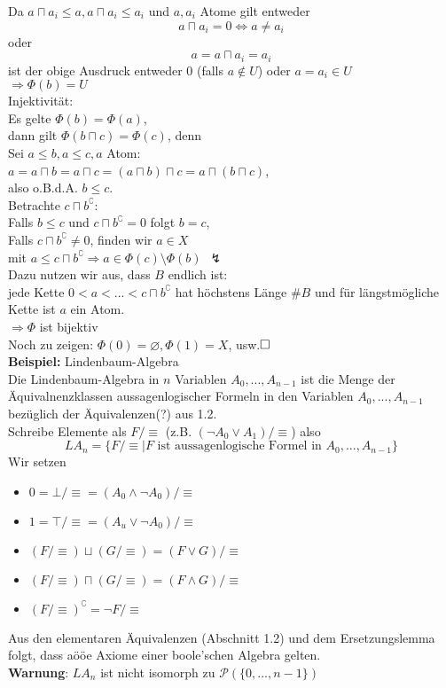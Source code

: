 \documentclass[a4paper]{scrartcl}
\begin{document}
Da $a \sqcap a_i \leq a, a \sqcap a_i \leq a_i $ und $a,a_i$ Atome gilt entweder
$$a \sqcap a_i = 0 \Leftrightarrow a \neq a_i$$
oder
$$a = a \sqcap a_i = a_i$$
ist der obige Ausdruck entweder $0$ (falls $a \notin U$) oder $a = a_i \in U$\\
$\Rightarrow \Phi(b) = U$\medskip\\
Injektivität:\\
Es gelte $\Phi(b) = \Phi(a)$,\\ 
dann gilt $\Phi(b \sqcap c) = \Phi(c)$, denn\medskip\\
Sei $a \leq b, a \leq c, a$ Atom:\\
$a = a \sqcap b = a \sqcap c = (a \sqcap b) \sqcap c = a \sqcap (b \sqcap c)$,\\
also o.B.d.A. $b \leq c$.\smallskip\\
Betrachte $c \sqcap b^\complement$:\\
Falls $b \leq c$ und $c \sqcap b^\complement = 0$ folgt $b=c$,\\
Falls $c \sqcap b^\complement \neq 0$, finden wir $a \in X$\\
mit $a \leq c \sqcap b^\complement \Rightarrow a \in \Phi(c)\setminus \Phi(b)\ \ \lightning$\medskip\\ %
Dazu nutzen wir aus, dass $B$ endlich ist:\\
jede Kette $0 < a < ... < c \sqcap b^\complement$ hat höchstens Länge $\#B$ und für längstmögliche Kette ist $a$ ein Atom.\medskip\\
$\Rightarrow \Phi$ ist bijektiv\medskip\\
Noch zu zeigen: $\Phi(0)= \varnothing, \Phi(1) = X$, usw.$\hfill\square$\medskip\\
\textbf{Beispiel:} Lindenbaum-Algebra\\
Die Lindenbaum-Algebra in $n$ Variablen $A_0,...,A_{n-1}$ ist die Menge der Äquivalnenzklassen aussagenlogischer Formeln in den Variablen $A_0,...,A_{n-1}$ bezüglich der Äquivalenzen(?) aus 1.2.\smallskip\\
Schreibe Elemente als $F/\equiv$ (z.B. $(\lnot A_0 \lor A_1)/\equiv$) also
$$L A_n = \{F/\equiv \mid F\text{ ist aussagenlogische Formel in }A_0,...,A_{n-1}\}$$
Wir setzen
\begin{itemize}
\item $0 = \bot/\equiv = (A_0 \land \lnot A_0)/\equiv$
\item $1 = \top /\equiv = (A_u \lor \lnot A_0)/\equiv$
\item $(F/\equiv)\sqcup(G/\equiv) = (F \lor G)/\equiv$
\item $(F/\equiv) \sqcap (G/\equiv) = (F \land G)/\equiv$
\item $(F/\equiv)^\complement = \lnot F/\equiv$
\end{itemize}
Aus den elementaren Äquivalenzen (Abschnitt 1.2) und dem Ersetzungslemma folgt, dass aööe Axiome einer boole'schen Algebra gelten.\medskip\\
\textbf{Warnung}: $L A_n$ ist nicht isomorph zu $\mathcal{P}(\{0,...,n-1\})$
\end{document}
